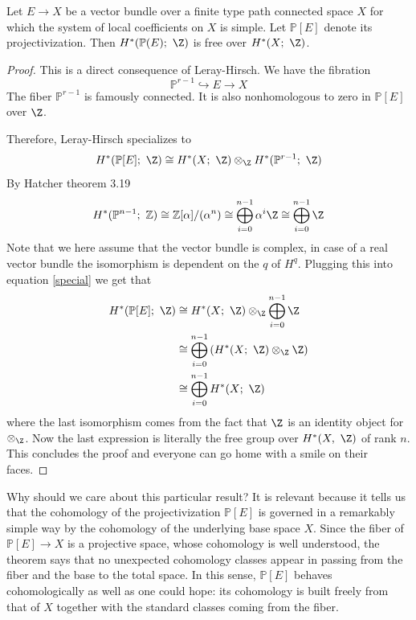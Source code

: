 \documentclass[11pt]{amsart}
\renewcommand{\P}{\mathbb{P}}
\begin{document}
\begin{theorem}
    Let $E\to X$ be a vector bundle over a finite type path connected space $X$ for which the system of local coefficients on $X$ is simple. Let   $\P[E]$ denote its projectivization. Then $H^*(\P(E);\ \Z)$ is free over $H^*(X;\ \Z)$.
\end{theorem}
\begin{proof}
    This is a direct consequence of Leray-Hirsch. We have the fibration
    \begin{equation*}
        \P^{r-1} \hookrightarrow E \to X
    \end{equation*}
   The fiber $\P^{r-1}$ is famously connected. It is also nonhomologous to zero in $\P[E]$  over $\Z$.

   Therefore, Leray-Hirsch specializes to
   \begin{equation}\label{special}
       H^*(\P[E];\ \Z) \cong  H^*(X;\ \Z)\otimes_\Z H^*(\P^{r-1};\ \Z)
   \end{equation}
  By Hatcher \cite{Hatcher} theorem 3.19  
  \begin{equation*}
      H^*(\mathbb{P}^{n-1};\ \mathbb{Z}) \cong \mathbb{Z}[\alpha]/(\alpha^{n})\cong \bigoplus_{i=0}^{n-1}\alpha^i \Z \cong \bigoplus_{i=0}^{n-1} \Z
  \end{equation*} Note that we here assume that the vector bundle is complex, in case of a real vector bundle the isomorphism is dependent on the $q$ of $H^q$.
  Plugging this into equation \eqref{special} we get that 
  \begin{align*}
       H^*(\P[E];\ \Z) &\cong  H^*(X;\ \Z)\otimes_\Z \bigoplus_{i=0}^{n-1} \Z \\
       & \cong \bigoplus_{i=0}^{n-1}\left( H^*(X;\ \Z)\otimes_\Z  \Z\right)\\
       & \cong \bigoplus_{i=0}^{n-1} H^*(X;\ \Z)
  \end{align*}
  where the last isomorphism comes from the fact that $\Z$ is an identity object for $\otimes_\Z$. Now the last expression is literally the free group over $H^*(X, \ \Z)$ of rank $n$. This concludes the proof and everyone can go home with a smile on their faces.

    
   
\end{proof}

Why should we care about this particular result?
It is relevant because it tells us that the cohomology of the projectivization $\P[E]$ is governed in a remarkably simple way by the cohomology of the underlying base space $X$. Since the fiber of $\P[E]\to X$ is a projective space, whose cohomology is well understood, the theorem says that no unexpected cohomology classes appear in passing from the fiber and the base to the total space. In this sense, $\P[E]$ behaves cohomologically as well as one could hope: its cohomology is built freely from that of $X$ together with the standard classes coming from the fiber.
\end{document}
